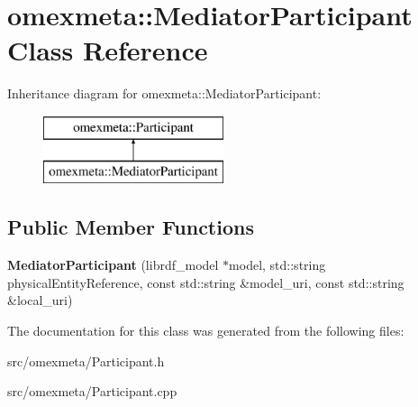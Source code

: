 \hypertarget{classomexmeta_1_1MediatorParticipant}{}\section{omexmeta\+:\+:Mediator\+Participant Class Reference}
\label{classomexmeta_1_1MediatorParticipant}
Inheritance diagram for omexmeta\+:\+:Mediator\+Participant\+:\begin{figure}[H]
\begin{center}
\leavevmode
\includegraphics[height=2.000000cm]{classomexmeta_1_1MediatorParticipant}
\end{center}
\end{figure}
\subsection*{Public Member Functions}
\begin{DoxyCompactItemize}
\item 
\mbox{\label{classomexmeta_1_1MediatorParticipant_a82d3e1fe6f987e1bf2ba838b75c9c3f0}} 
{\bfseries Mediator\+Participant} (librdf\+\_\+model $\ast$model, std\+::string physical\+Entity\+Reference, const std\+::string \&model\+\_\+uri, const std\+::string \&local\+\_\+uri)
\end{DoxyCompactItemize}


The documentation for this class was generated from the following files\+:\begin{DoxyCompactItemize}
\item 
src/omexmeta/Participant.\+h\item 
src/omexmeta/Participant.\+cpp\end{DoxyCompactItemize}
